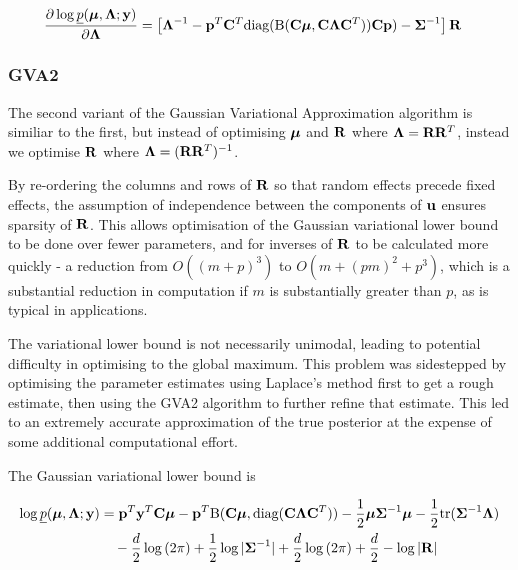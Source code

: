 \documentclass{article}[12pt]
\begin{document}
\begin{align*}
\frac{\partial \log \underline{p}({\boldsymbol \mu}, {\boldsymbol \Lambda}; {\bf y})}{\partial {\boldsymbol\Lambda}} &= \left [{\boldsymbol \Lambda}^{-1} - {\bf p}^T {\bf C}^T \text{diag}({\text{B}}({\bf C} {\boldsymbol \mu}, {\bf C} {\boldsymbol \Lambda} {\bf C}^T)) {\bf C} {\bf p}) - {\boldsymbol \Sigma}^{-1} \right ] {\bf R}
\end{align*} 
 
\subsubsection{GVA2}
The second variant of the Gaussian Variational Approximation algorithm is similiar 
to the first, but instead of optimising ${\boldsymbol \mu}$ and ${\bf R}$ where ${\boldsymbol \Lambda}={\bf R} {\bf R}^T$,
instead we optimise ${\bf R}$ where ${\boldsymbol \Lambda} = ({\bf R} {\bf R}^T)^{-1}$.

\noindent By re-ordering the columns and rows of ${\bf R}$ so that random effects
precede fixed effects, the assumption of independence between the components of
${\bf u}$ ensures sparsity of ${\bf R}$. This allows optimisation of the Gaussian 
variational lower bound to be done over fewer parameters, and for inverses of ${\bf R}$ 
to be calculated more quickly - a reduction from $O((m + p)^3)$ to
$O(m + (pm)^2 + p^3)$, which is a substantial reduction in computation if $m$ is 
substantially greater than $p$, as is typical in applications.


\noindent The variational lower bound is not necessarily unimodal, leading to 
potential difficulty in optimising to the global maximum. This problem was 
sidestepped by optimising the parameter estimates using Laplace's method first to 
get a rough estimate, then using the GVA2 algorithm to further refine that estimate. 
This led to an extremely accurate approximation of the true posterior at the expense 
of some additional computational effort.

\noindent The Gaussian variational lower bound is

\begin{align*}
\log \underline{p}({\boldsymbol \mu}, {\boldsymbol \Lambda}; {\bf y}) &= {\bf p}^T{\bf y}^T{\bf C} {\boldsymbol \mu} - {\bf p}^T {\text{B}}({\bf C} {\boldsymbol \mu}, \text{diag}({\bf C} {\boldsymbol \Lambda} {\bf C}^T)) - {\frac{1}{2}} {\boldsymbol \mu} {\boldsymbol \Sigma}^{-1} {\boldsymbol \mu} - {\frac{1}{2}} \text{tr}{({\boldsymbol\Sigma}^{-1} {\boldsymbol\Lambda})} \\
&\quad- \frac{d}{2} \log{(2 \pi)} + {\frac{1}{2}} \log{|{\boldsymbol\Sigma}^{-1}|} + \frac{d}{2} \log{(2 \pi)} + \frac{d}{2} - \log{|{\bf R}|}
\end{align*}
\end{document}
